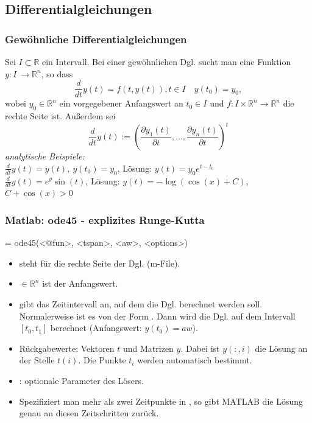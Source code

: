 \documentclass[hyperref={xetex}]{beamer}
\begin{document}
\subsection{Differentialgleichungen}
%
%
\begin{frame}[fragile]\frametitle{Gew\"ohnliche Differentialgleichungen}
Sei $I \subset \mathbb{R}$ ein Intervall. Bei einer gewöhnlichen Dgl. sucht man eine Funktion $y:I \
\longrightarrow \mathbb{R}^n$, so dass
\alert{ \[ \frac{d}{dt}y(t)=f(t,y(t)), t\in I\quad y(t_0)=y_0, \]}
wobei $y_0 \in \mathbb{R}^n$ ein vorgegebener Anfangswert an $t_0\in I$
und $f:I \times \mathbb{R}^n \longrightarrow \mathbb{R}^n$ die
rechte Seite ist. Au{\ss}erdem sei 
\[\frac{d}{dt}y(t) :=\left(\frac{\partial
  y_1(t)}{\partial t}, \dots, \frac{\partial
  y_n(t)}{\partial t}\right)^t\] 
\textsl{analytische Beispiele:}\\
$\frac{d}{dt} y(t) = y(t), \ y(t_0)=y_0$, \quad L\"osung:
$y(t)=y_0 e^{t-t_0}$\\
$\frac{d}{dt} y(t) = e^y \sin(t)$, \quad L\"osung: $y(t)=-\log( \cos(x)+C)$, $C+\cos(x)>0$
\end{frame}
%
%
\begin{frame}[fragile]\frametitle{Matlab: ode45 - explizites Runge-Kutta} 
\begin{matlabin}
[<t>,<y>] = ode45(<@fun>, <tspan>, <aw>, <options>)
\end{matlabin}
\begin{itemize}
\item {} steht f\"ur die rechte Seite der Dgl. (m-File).
\item \mcode{aw} $\in \mathbb{R}^n$ ist der Anfangswert.
\item {} gibt das Zeitintervall an, auf dem die Dgl. berechnet
  werden soll. Normalerweise ist es von der Form
  . Dann wird die Dgl. auf dem Intervall $[t_0,
  t_1]$ berechnet (Anfangswert: $y(t_0)=aw$).
\item Rückgabewerte: Vektoren $t$ und Matrizen $y$. Dabei ist
  $y(:,i)$ die L\"osung an der Stelle $t(i)$. Die Punkte $t_i$ werden
  automatisch bestimmt.
\item {}: optionale Parameter des L\"osers. 
\item Spezifiziert man mehr als zwei Zeitpunkte in , so gibt MATLAB die
  L\"osung genau an diesen Zeitschritten zur\"uck.
\end{itemize}
\end{frame}
%
%
\end{document}

